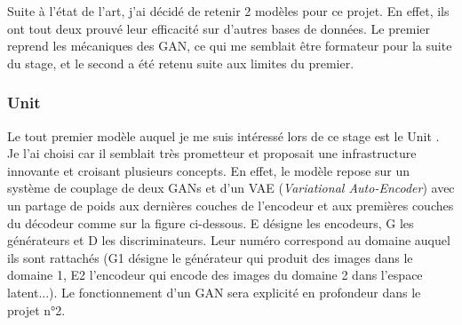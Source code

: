 \documentclass[12pt, oneside, a4paper, titlepage]{article}
\begin{document}
\vspace{5mm}

Suite à l'état de l'art, j'ai décidé de retenir 2 modèles pour ce projet. En effet, ils ont tout deux prouvé leur efficacité sur d'autres bases de données. Le premier reprend les mécaniques des GAN, ce qui me semblait être formateur pour la suite du stage, et le second a été retenu suite aux limites du premier.

\subsubsection{Unit}

Le tout premier modèle auquel je me suis intéressé lors de ce stage est le Unit \cite{liu_unsupervised_2018}. Je l'ai choisi car il semblait très prometteur et proposait une infrastructure innovante et croisant plusieurs concepts. En effet, le modèle repose sur un système de couplage de deux GANs et d'un VAE (\textit{Variational Auto-Encoder}) avec un partage de poids aux dernières couches de l'encodeur et aux premières couches du décodeur comme sur la figure ci-dessous. E désigne les encodeurs, G les générateurs et D les discriminateurs. Leur numéro correspond au domaine auquel ils sont rattachés (G1 désigne le générateur qui produit des images dans le domaine 1, E2 l'encodeur qui encode des images du domaine 2 dans l'espace latent...). Le fonctionnement d'un GAN sera explicité en profondeur dans le projet n°2.
\end{document}
